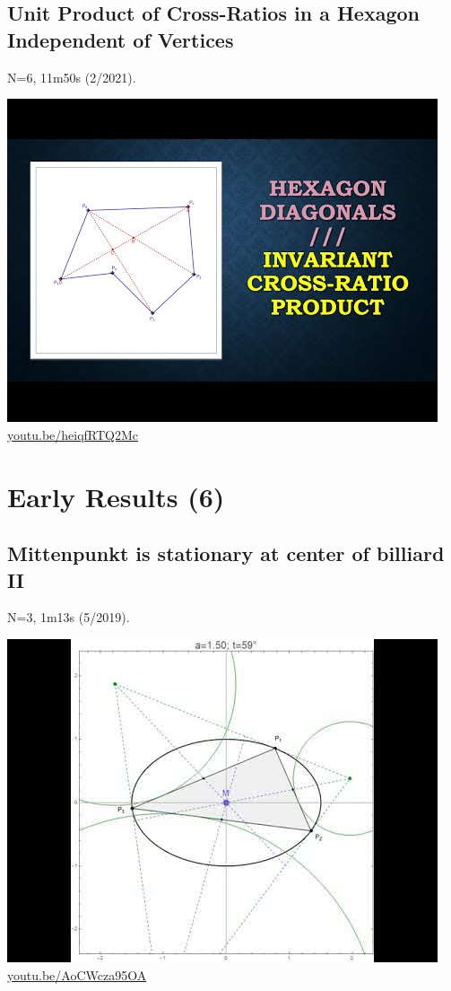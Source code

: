 \documentclass[12pt]{amsart}
\begin{document}
\subsection{Unit Product of Cross-Ratios in a Hexagon Independent of Vertices}
\label{vid:heiqfRTQ2Mc}
\noindent N=6, 11m50s (2/2021). 
\begin{center}\includegraphics[width=.5\textwidth]{pics/heiqfRTQ2Mc.jpg} \\ 
\href{https://youtu.be/heiqfRTQ2Mc}{\url{youtu.be/heiqfRTQ2Mc}}\end{center}
% 

\section{Early Results (6)}

\subsection{Mittenpunkt is stationary at center of billiard II}
\label{vid:AoCWcza95OA}
\noindent N=3, 1m13s (5/2019). 
\begin{center}\includegraphics[width=.5\textwidth]{pics/AoCWcza95OA.jpg} \\ 
\href{https://youtu.be/AoCWcza95OA}{\url{youtu.be/AoCWcza95OA}}\end{center}
% 
\end{document}
